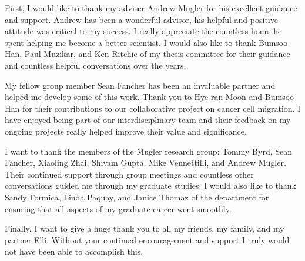 %
%
%
%


\begin{acknowledgments}
  First, I would like to thank my adviser Andrew Mugler for his excellent guidance and support.
  Andrew has been a wonderful advisor, his helpful and positive attitude was critical to my success. I really appreciate the countless hours he spent helping me become a better scientist.
  I would also like to thank Bumsoo Han, Paul Muzikar, and Ken Ritchie of my thesis committee for their guidance and countless helpful conversations over the years.

  My fellow group member Sean Fancher has been an invaluable partner and helped me develop some of this work. Thank you to Hye-ran Moon and Bumsoo Han for their contributions to our collaborative project on cancer cell migration. I have enjoyed being part of our interdisciplinary team and their feedback on my ongoing projects really helped improve their value and significance.

  I want to thank the members of the Mugler research group: Tommy Byrd, Sean Fancher, Xiaoling Zhai, Shivam Gupta, Mike Vennettilli, and Andrew Mugler. Their continued support through group meetings and countless other conversations guided me through my graduate studies.
  I would also like to thank Sandy Formica, Linda Paquay, and Janice Thomaz of the department for ensuring that all aspects of my graduate career went smoothly.

  Finally, I want to give a huge thank you to all my friends, my family, and my partner Elli. Without your continual encouragement and support I truly would not have been able to accomplish this.
\end{acknowledgments}

